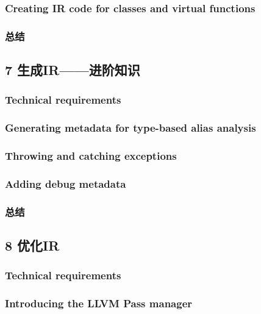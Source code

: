 \documentclass[11pt,a4paper,UTF8]{ctexart}
\begin{document}
		\subsubsection{Creating IR code for classes and virtual functions}
		\subsubsection{总结}
	\subsection{7 生成IR——进阶知识}
		\subsubsection{Technical requirements}
		\subsubsection{Generating metadata for type-based alias analysis}
		\subsubsection{Throwing and catching exceptions}
		\subsubsection{Adding debug metadata}
		\subsubsection{总结}
	\subsection{8 优化IR}
		\subsubsection{Technical requirements}
		\subsubsection{Introducing the LLVM Pass manager}
\end{document}
